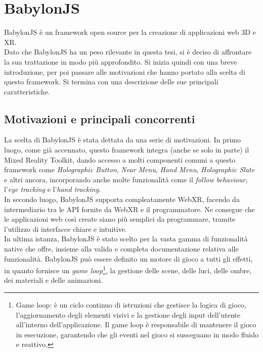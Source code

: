 \section{BabylonJS}\label{sec:BabylonJS}
BabylonJS è un framework open source per la creazione di applicazioni web 3D e XR\cite{BabylonJS}.\\
Dato che BabylonJS ha un peso rilevante in questa tesi, si è deciso di affrontare la sua trattazione in modo più approfondito. Si inizia quindi con una breve introduzione, per poi
passare alle motivazioni che hanno portato alla scelta di questo framework. Si termina con una descrizione delle sue principali caratteristiche.\\

\subsection{Motivazioni e principali concorrenti}\label{subsec:BabylonJS_motivazioni}
La scelta di BabylonJS è stata dettata da una serie di motivazioni. In primo luogo, come già accennato, questo framework integra (anche se solo in parte) il Mixed Reality
Toolkit, dando accesso a molti componenti comuni a questo framework come \textit{Holographic Button}, \textit{Near Menu}, \textit{Hand Menu}, \textit{Holographic Slate} e altri 
ancora, incorporando anche molte funzionalità come il \textit{follow behaviour}, l'\textit{eye tracking} e l'\textit{hand tracking}.\\
In secondo luogo, BabylonJS supporta compleatamente WebXR, facendo da intermediario tra le API fornite da WebXR e il programmatore. Ne consegue che le applicazioni web così
create siano più semplici da programmare, tramite l'utilizzo di interfacce chiare e intuitive.\\
In ultima istanza, BabylonJS è stato scelto per la vasta gamma di funzionalità native che offre, insieme alla valida e completa documentazione relativa alle funzionalità. BabylonJS
può essere definito un motore di gioco a tutti gli effetti, in quanto fornisce un \textit{game loop}\footnote{
    Game loop: è un ciclo continuo di istruzioni che gestisce la logica di gioco, l'aggiornamento degli elementi visivi e la gestione degli input dell'utente all'interno 
    dell'applicazione. Il game loop è responsabile di mantenere il gioco in esecuzione, garantendo che gli eventi nel gioco si  susseguano in modo fluido e reattivo.
}, la gestione delle scene, delle luci, delle ombre, dei materiali e 
delle animazioni.
\newline \newline
